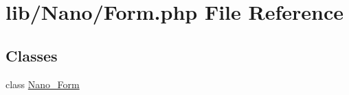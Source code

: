 \hypertarget{Form_8php}{
\section{lib/Nano/Form.php File Reference}
\label{Form_8php}
}
\subsection*{Classes}
\begin{CompactItemize}
\item 
class \hyperlink{classNano__Form}{Nano\_\-Form}
\end{CompactItemize}
